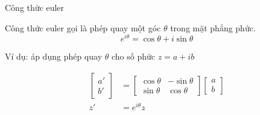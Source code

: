 \begin{frame}{Công thức euler}
    \begin{mdframed}[backgroundcolor=BlueDefault!10, linecolor=BlueDefault, linewidth=0.5pt, roundcorner=1pt]
        Công thức euler gọi là phép quay một góc \(\theta\) trong mặt phẳng phức.
        \begin{equation}
            e^{i\theta} = \cos{\theta} + i \sin{\theta}
            \label{eq:1.1_2}
        \end{equation}
    \end{mdframed}
    \vspace{2mm}
    
    Ví dụ: áp dụng phép quay \(\theta\) cho số phức \(z = a + i b\)
    \begin{center}
        \begin{minipage}{0.4\linewidth}
            \begin{equation*}
            \begin{split}
                \left[
            \begin{array}{c}
                a' \\
                b'
            \end{array}
            \right]  &= \left[\begin{array}{cc}
               \cos{\theta}  & -\sin{\theta} \\
               \sin{\theta}  & \cos{\theta}
            \end{array} \right] \left[
            \begin{array}{c}
                a \\
                b
            \end{array}
            \right]  \\
           z' &=  e^{i\theta}z
            \end{split}
            \end{equation*}
        \end{minipage}
        \hspace{1mm}
        \begin{minipage}{0.4\linewidth}
            \begin{center}
                \resizebox{1\linewidth}{!}{}
            \end{center}
        \end{minipage}
    \end{center}
\end{frame}
